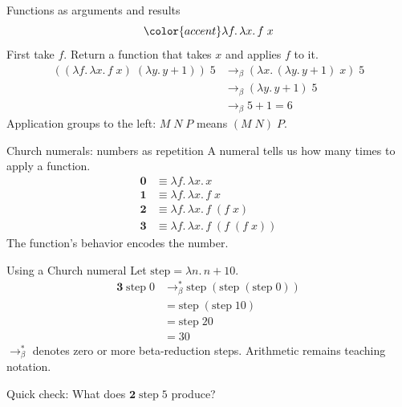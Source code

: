 \documentclass[aspectratio=169,11pt]{beamer}
\newcommand{\key}[1]{{\color{accent}#1}}
\begin{document}
\begin{frame}{Functions as arguments and results}
\[\key{\lambda f.\,\lambda x.\,f\;x}\]
First take $f$. Return a function that takes $x$ and applies $f$ to it.
\vspace{3mm}
\begin{align*}
((\lambda f.\,\lambda x.\,f\;x)\;(\lambda y.\,y+1))\;5
&\longrightarrow_{\beta}(\lambda x.\,(\lambda y.\,y+1)\;x)\;5\\
&\longrightarrow_{\beta}(\lambda y.\,y+1)\;5\\
&\longrightarrow_{\beta}5+1=6
\end{align*}
{\small Application groups to the left: $M\;N\;P$ means $(M\;N)\;P$.}
\end{frame}

\begin{frame}{Church numerals: numbers as repetition}
A numeral tells us how many times to apply a function.
\begin{align*}
\mathbf{0}&\equiv\lambda f.\,\lambda x.\,x\\[2mm]
\mathbf{1}&\equiv\lambda f.\,\lambda x.\,f\;x\\[2mm]
\mathbf{2}&\equiv\lambda f.\,\lambda x.\,f\;(f\;x)\\[2mm]
\mathbf{3}&\equiv\lambda f.\,\lambda x.\,f\;(f\;(f\;x))
\end{align*}
\key{The function's behavior encodes the number.}
\end{frame}

\begin{frame}{Using a Church numeral}
Let $\mathrm{step}=\lambda n.\,n+10$.
\begin{align*}
\mathbf{3}\;\mathrm{step}\;0
&\longrightarrow_{\beta}^{*}\mathrm{step}\;(\mathrm{step}\;(\mathrm{step}\;0))\\[2mm]
&=\mathrm{step}\;(\mathrm{step}\;10)\\[2mm]
&=\mathrm{step}\;20\\[2mm]
&=30
\end{align*}
{\small $\longrightarrow_{\beta}^{*}$ denotes zero or more beta-reduction steps. Arithmetic remains teaching notation.}
\vspace{4mm}

\key{Quick check:} What does $\mathbf{2}\;\mathrm{step}\;5$ produce?
\end{frame}
\end{document}
